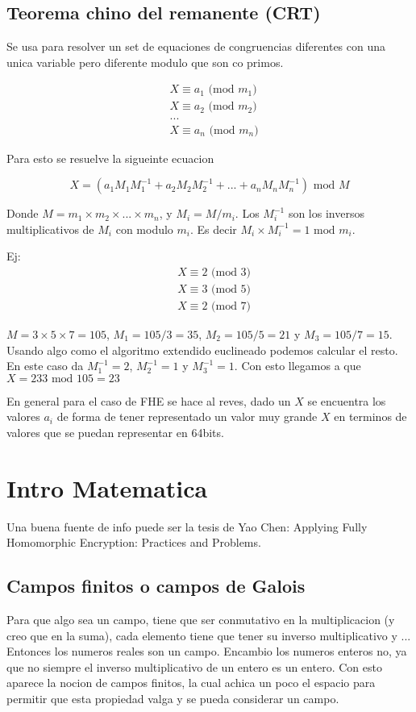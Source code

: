 \documentclass[12pt, oneside]{article}
\begin{document}
\subsection{Teorema chino del remanente (CRT)}
Se usa para resolver un set de equaciones de congruencias diferentes con  una unica variable
pero diferente modulo que son co primos.

\begin{align*}
    &X \equiv a_1 \text{ (mod } m_1)\\
    &X \equiv a_2 \text{ (mod } m_2)\\
    &... \\
    &X \equiv a_n \text{ (mod } m_n)
\end{align*}

Para esto se resuelve la sigueinte ecuacion

\begin{equation}
    X=(a_1M_1M_1^{-1}+a_2M_2M_2^{-1}+...+a_nM_nM_n^{-1})\text{ mod } M
    \label{eq:crt}
\end{equation}

Donde $M=m_1\times m_2\times ...\times m_n$, y $M_i=M/m_i$.
Los $M_i^{-1}$ son los inversos multiplicativos de $M_i$ con modulo $m_i$.
Es decir $M_i\times M_i^{-1} = 1 \text{ mod }m_i$.

Ej:
\begin{align*}
    &X \equiv 2 \text{ (mod } 3)\\
    &X \equiv 3 \text{ (mod } 5)\\
    &X \equiv 2 \text{ (mod } 7)
\end{align*}

$M=3\times5\times7=105$, $M_1=105/3=35$, $M_2=105/5=21$ y $M_3=105/7=15$.
Usando algo como el algoritmo extendido euclineado podemos calcular el resto.
En este caso da $M_1^{-1}=2$, $M_2^{-1}=1$ y  $M_3^{-1}=1$.
Con esto llegamos a que $X=233 \text{ mod } 105 = 23$

En general para el caso de FHE se hace al reves, dado un $X$ se encuentra los
valores $a_i$ de forma de tener representado un valor muy grande $X$ en terminos
de valores que se puedan representar en 64bits.


\section{Intro Matematica}
Una buena fuente de info puede ser la tesis de Yao Chen: Applying Fully Homomorphic
Encryption: Practices and Problems.

\subsection{Campos finitos o campos de Galois}
Para que algo sea un campo, tiene que ser conmutativo en la multiplicacion (y creo que en la suma),
cada elemento tiene que tener su inverso multiplicativo y ...
Entonces los numeros reales son un campo.
Encambio los numeros enteros no, ya que no siempre el inverso multiplicativo de un entero
es un entero.
Con esto aparece la nocion de campos finitos, la cual achica un poco el espacio para
permitir que esta propiedad valga y se pueda considerar un campo.
\end{document}
